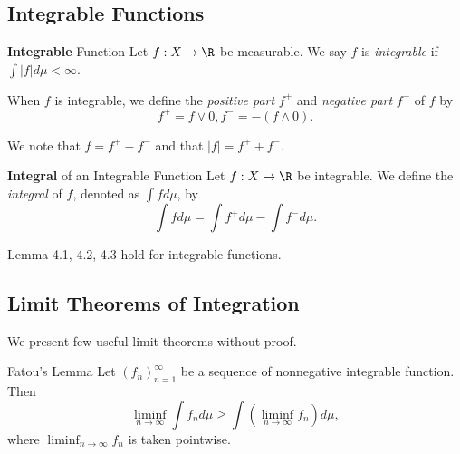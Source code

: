 \documentclass[stat901]{subfiles}
\begin{document}
    \rruleline

    \subsection{Integrable Functions}

    \begin{definition}{\textbf{Integrable} Function}
        Let $f:X\to\R$ be measurable. We say $f$ is \emph{integrable} if $\int\left| f \right|d\mu<\infty$.

        When $f$ is integrable, we define the \emph{positive part} $f^+$ and \emph{negative part} $f^-$ of $f$ by
        \begin{equation*}
            f^+ = f\vee 0, f^- = -\left(f\wedge 0\right).
        \end{equation*}
    \end{definition}

    \np We note that $f = f^+-f^-$ and that $\left| f \right| = f^++f^-$.

    \begin{definition}{\textbf{Integral} of an Integrable Function}
        Let $f:X\to\R$ be integrable. We define the \emph{integral} of $f$, denoted as $\int fd\mu$, by
        \begin{equation*}
            \int fd\mu = \int f^+d\mu - \int f^-d\mu.
        \end{equation*}
    \end{definition}
    
    \begin{theorem}{}
        Lemma 4.1, 4.2, 4.3 hold for integrable functions.
    \end{theorem}
    
    \rruleline

    \subsection{Limit Theorems of Integration}

    \np We present few useful limit theorems without proof.
    
    \begin{theorem}{Fatou's Lemma}
        Let $\left( f_{n} \right)^{\infty}_{n=1}$ be a sequence of nonnegative integrable function. Then
        \begin{equation*}
            \liminf_{n\to\infty} \int f_nd\mu \geq \int \left( \liminf_{n\to\infty}f_n \right)d\mu,
        \end{equation*}
        where $\liminf_{n\to\infty}f_n$ is taken pointwise.
    \end{theorem}
\end{document}

